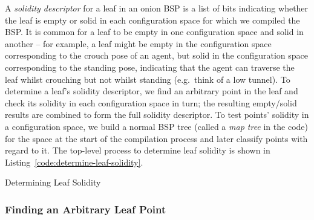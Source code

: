 \documentclass[10pt,twocolumn]{article}
\begin{document}
A \emph{solidity descriptor} for a leaf in an onion BSP is a list of bits indicating whether the leaf is empty or solid in each configuration space for which we compiled the BSP. It is common for a leaf to be empty in one configuration space and solid in another -- for example, a leaf might be empty in the configuration space corresponding to the crouch pose of an agent, but solid in the configuration space corresponding to the standing pose, indicating that the agent can traverse the leaf whilst crouching but not whilst standing (e.g.~think of a low tunnel). To determine a leaf's solidity descriptor, we find an arbitrary point in the leaf and check its solidity in each configuration space in turn; the resulting empty/solid results are combined to form the full solidity descriptor. To test points' solidity in a configuration space, we build a normal BSP tree (called a \emph{map tree} in the code) for the space at the start of the compilation process and later classify points with regard to it. The top-level process to determine leaf solidity is shown in Listing~\ref{code:determine-leaf-solidity}.

\begin{stulisting}[!t]
\caption{Determining Leaf Solidity}
\label{code:determine-leaf-solidity}

\end{stulisting}

\subsubsection{Finding an Arbitrary Leaf Point}
\end{document}
